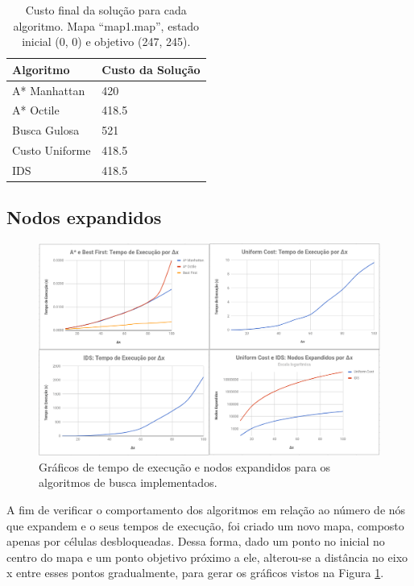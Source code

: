 \documentclass[12pt]{article}
\begin{document}
\begin{table}[htp]
\centering
\begin{tabular}{|l|l|}
\hline
\textbf{Algoritmo} & \textbf{Custo da Solução} \\ \hline
A* Manhattan       & 420                       \\ \hline
A* Octile          & 418.5                     \\ \hline
Busca Gulosa         & 521                       \\ \hline
Custo Uniforme       & 418.5                     \\ \hline
IDS                & 418.5                     \\ \hline
\end{tabular}
\caption{Custo final da solução para cada algoritmo. Mapa ``map1.map'', estado inicial (0, 0) e objetivo (247, 245).}
\label{tab:costs}
\end{table}

\subsection{Nodos expandidos}

\begin{figure}[htp!]
	\begin{center}
	  \includegraphics[scale=0.35]{charts.png}
	\end{center}
	\caption{Gráficos de tempo de execução e nodos expandidos para os algoritmos de busca implementados.}
	\label{fig:charts}
\end{figure}

A fim de verificar o comportamento dos algoritmos em relação ao número de nós que expandem e o seus tempos de execução, foi criado um novo mapa, composto apenas por células desbloqueadas. Dessa forma, dado um ponto no inicial no centro do mapa e um ponto objetivo próximo a ele, alterou-se a distância no eixo x entre esses pontos gradualmente, para gerar os gráficos vistos na Figura \ref{fig:charts}.
\end{document}
